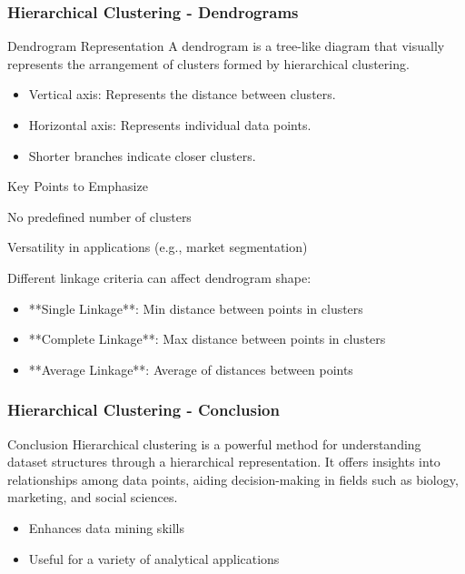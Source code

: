 \documentclass[aspectratio=169]{beamer}
\begin{document}
\begin{frame}[fragile]
    \frametitle{Hierarchical Clustering - Dendrograms}
    \begin{block}{Dendrogram Representation}
        A dendrogram is a tree-like diagram that visually represents the arrangement of clusters formed by hierarchical clustering. 
    \end{block}
    
    \begin{itemize}
        \item Vertical axis: Represents the distance between clusters.
        \item Horizontal axis: Represents individual data points.
        \item Shorter branches indicate closer clusters.
    \end{itemize}
    
    \begin{block}{Key Points to Emphasize}
        \item No predefined number of clusters
        \item Versatility in applications (e.g., market segmentation)
        \item Different linkage criteria can affect dendrogram shape:
            \begin{itemize}
                \item **Single Linkage**: Min distance between points in clusters
                \item **Complete Linkage**: Max distance between points in clusters
                \item **Average Linkage**: Average of distances between points
            \end{itemize}
    \end{block}
\end{frame}

\begin{frame}[fragile]
    \frametitle{Hierarchical Clustering - Conclusion}
    \begin{block}{Conclusion}
        Hierarchical clustering is a powerful method for understanding dataset structures through a hierarchical representation. It offers insights into relationships among data points, aiding decision-making in fields such as biology, marketing, and social sciences.
    \end{block}
    
    \begin{itemize}
        \item Enhances data mining skills
        \item Useful for a variety of analytical applications
    \end{itemize}
\end{frame}
\end{document}
